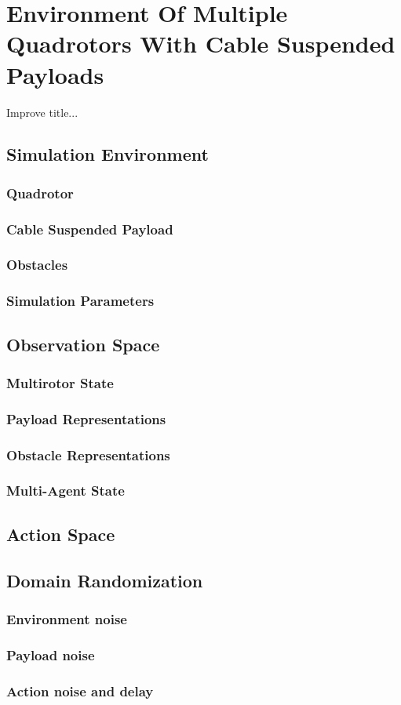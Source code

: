\chapter{Environment Of Multiple Quadrotors With Cable Suspended Payloads}
Improve title...
\section{Simulation Environment}
\subsection{Quadrotor}
\subsection{Cable Suspended Payload}
\subsection{Obstacles}
\subsection{Simulation Parameters}

\section{Observation Space}
\subsection{Multirotor State}
\subsection{Payload Representations}
\subsection{Obstacle Representations}
\subsection{Multi-Agent State}

\section{Action Space}

\section{Domain Randomization}

\subsection{Environment noise}
\subsection{Payload noise}
\subsection{Action noise and delay}
